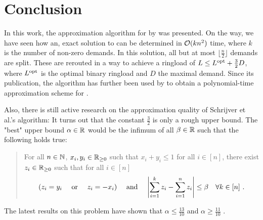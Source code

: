 \section{Conclusion}

In this work, the approximation algorithm for \RL by \citet{schrijver99} was presented.
On the way, we have seen how an, exact solution to \RRL can be determined in $\mathcal{O}(k n^2)$ time, where $k$ is the number of non-zero demands.
In this solution, all but at most $\lfloor \frac{n}{2} \rfloor$ demands are split.
These are rerouted in a way to achieve a ringload of $L \leq L^{\mathrm{opt}} + \frac{3}{2}D$, where $L^{\mathrm{opt}}$ is the optimal binary ringload and $D$ the maximal demand.
Since its publication, the algorithm has further been used by \citet{khanna97} to obtain a polynomial-time approximation scheme for \RL.

Also, there is still active research on the approximation quality of Schrijver et al.'s algorithm:
It turns out that the constant $\frac{3}{2}$ is only a rough upper bound.
The "best" upper bound $\alpha \in \mathbb{R}$ would be the infimum of all $\beta \in \mathbb{R}$ such that the following holds true:
\begin{quote}
	For all $n \in \mathbb{N}$, $x_i, y_i \in \mathbb{R}_{\geq 0}$ such that $x_i + y_i \leq 1$ for all $i \in [n]$, there exist $z_i \in \mathbb{R}_{\geq 0}$ such that for all $i \in [n]$
	\begin{equation}
		(z_i = y_i \quad \text{ or } \quad z_i = -x_i) 
		\quad \text{ and } \quad \abs{\sum_{i=1}^k z_i - \sum_{i = 1}^n z_i} \leq \beta \quad \forall k \in [n] \ .
	\end{equation}
\end{quote}
The latest results on this problem have shown that $\alpha \leq \frac{13}{10}$ and $\alpha \geq \frac{11}{10}$ \cite{skutella16, daubel19}.